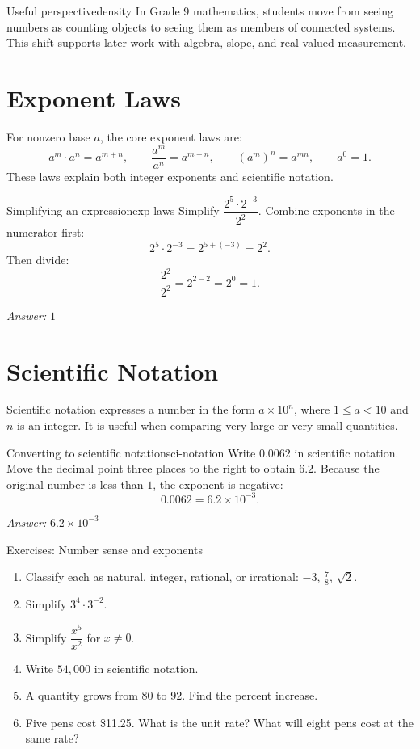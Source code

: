 \documentclass[11pt,oneside]{book}
\newcommand{\answerline}{\par\smallskip\noindent\textit{Answer: }}
\begin{document}
\begin{theorembox}{Useful perspective}{density}
In Grade 9 mathematics, students move from seeing numbers as counting objects to seeing them as members of connected systems. This shift supports later work with algebra, slope, and real-valued measurement.
\end{theorembox}

\section{Exponent Laws}
For nonzero base $a$, the core exponent laws are:
\[
 a^m\cdot a^n=a^{m+n}, \qquad \frac{a^m}{a^n}=a^{m-n}, \qquad (a^m)^n=a^{mn}, \qquad a^0=1.
\]
These laws explain both integer exponents and scientific notation.

\begin{example}{Simplifying an expression}{exp-laws}
Simplify $\dfrac{2^5\cdot 2^{-3}}{2^2}$.
\tcblower
Combine exponents in the numerator first:
\[
2^5\cdot 2^{-3}=2^{5+(-3)}=2^2.
\]
Then divide:
\[
\frac{2^2}{2^2}=2^{2-2}=2^0=1.
\]
\answerline $1$
\end{example}

\section{Scientific Notation}
Scientific notation expresses a number in the form $a\times 10^n$, where $1\le a<10$ and $n$ is an integer. It is useful when comparing very large or very small quantities.

\begin{example}{Converting to scientific notation}{sci-notation}
Write $0.0062$ in scientific notation.
\tcblower
Move the decimal point three places to the right to obtain $6.2$. Because the original number is less than $1$, the exponent is negative:
\[
0.0062=6.2\times 10^{-3}.
\]
\answerline $6.2\times 10^{-3}$
\end{example}

\begin{exercisebox}{Exercises: Number sense and exponents}
\begin{enumerate}
  \item Classify each as natural, integer, rational, or irrational: $-3$, $\frac{7}{8}$, $\sqrt{2}$.
  \item Simplify $3^4\cdot 3^{-2}$.
  \item Simplify $\dfrac{x^5}{x^2}$ for $x\neq 0$.
  \item Write $54{,}000$ in scientific notation.
  \item A quantity grows from $80$ to $92$. Find the percent increase.
  \item Five pens cost \$11.25. What is the unit rate? What will eight pens cost at the same rate?
\end{enumerate}
\end{exercisebox}
\end{document}
